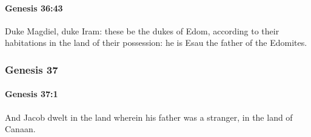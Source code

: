 		\paragraph{Genesis 36:43} %
			\label{GENESIS-36-43}

			Duke Magdiel, duke Iram: these be the dukes of Edom, according to their habitations in the land of their possession: he is Esau the father of the Edomites.

	\subsubsection{Genesis 37} %
		\label{GENESIS-37}

		\paragraph{Genesis 37:1} %
			\label{GENESIS-37-1}

			And Jacob dwelt in the land wherein his father was a stranger, in the land of Canaan.

